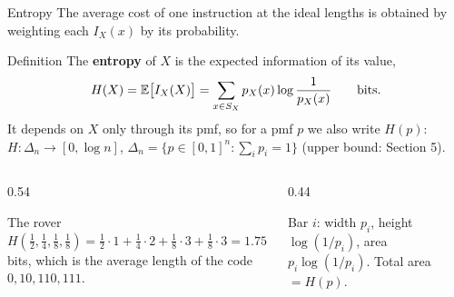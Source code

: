 \begin{frame}{Entropy}
  \small
  The average cost of one instruction at the ideal lengths is obtained by weighting each $I_X(x)$ by its probability.
  \begin{block}{Definition}
    The \textbf{entropy} of $X$ is the expected information of its value,
    \[
      H(X)=\mathbb{E}\big[I_X(X)\big]=\sum_{x\in S_X}p_X(x)\log\frac1{p_X(x)}\qquad\text{bits.}
    \]
    It depends on $X$ only through its pmf, so for a pmf $p$ we also write $H(p)$: $H\colon\Delta_n\to[0,\log n]$, $\Delta_n=\{p\in[0,1]^n:\sum_ip_i=1\}$ (upper bound: Section 5).
  \end{block}
  \begin{columns}[T]
    \begin{column}{0.54\textwidth}
      \begin{exampleblock}{The rover}
        $H(\tfrac12,\tfrac14,\tfrac18,\tfrac18)=\tfrac12\cdot1+\tfrac14\cdot2+\tfrac18\cdot3+\tfrac18\cdot3=1.75$ bits, which is the average length of the code $0,10,110,111$.
      \end{exampleblock}
    \end{column}
    \begin{column}{0.44\textwidth}
      \centering
      \par
      {\footnotesize Bar $i$: width $p_i$, height $\log(1/p_i)$, area $p_i\log(1/p_i)$. Total area $=H(p)$.}
    \end{column}
  \end{columns}
\end{frame}

